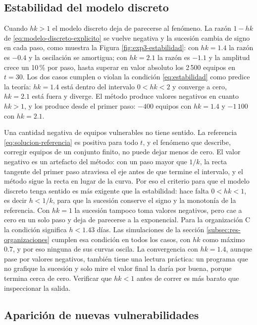 \subsection{Estabilidad del modelo discreto}
\label{subsec:dis-estabilidad}

Cuando $hk > 1$ el modelo discreto deja de parecerse al fenómeno. La razón $1 - hk$ de
\eqref{eq:modelo-discreto-explicito} se vuelve negativa y la sucesión cambia de signo en cada
paso, como muestra la Figura \ref{fig:exp3-estabilidad}: con $hk = 1.4$ la razón es
$-0.4$ y la oscilación se amortigua; con $hk = 2.1$ la razón es $-1.1$ y la amplitud crece un
10\,\% por paso, hasta superar en valor absoluto los 2\,500 equipos en $t = 30$. Los dos
casos cumplen o violan la condición \eqref{eq:estabilidad} como predice la teoría: $hk = 1.4$
está dentro del intervalo $0 < hk < 2$ y converge a cero, $hk = 2.1$ está fuera y diverge.
El método produce valores negativos en cuanto $hk > 1$, y los produce desde el primer paso:
$-400$ equipos con $hk = 1.4$ y $-1\,100$ con $hk = 2.1$.

Una cantidad negativa de equipos vulnerables no tiene sentido. La referencia
\eqref{eq:solucion-referencia} es positiva para todo $t$, y el fenómeno que describe, corregir
equipos de un conjunto finito, no puede dejar menos de cero. El valor negativo es un artefacto
del método: con un paso mayor que $1/k$, la recta tangente del primer paso atraviesa el eje
antes de que termine el intervalo, y el método sigue la recta en lugar de la curva. Por eso el
criterio para que el modelo discreto tenga sentido es más exigente que la estabilidad: hace
falta $0 < hk < 1$, es decir $h < 1/k$, para que la sucesión conserve el signo y la monotonía de
la referencia. Con $hk = 1$ la sucesión tampoco toma valores negativos, pero cae a cero en un
solo paso y deja de parecerse a la exponencial. Para la organización C la condición significa
$h < 1.43$ días. Las simulaciones de la
sección \ref{subsec:res-organizaciones} cumplen esa condición en todos los casos, con $hk$ como
máximo $0.7$, y por eso ninguna de sus curvas oscila. La convergencia con $hk = 1.4$, aunque
pase por valores negativos, también tiene una lectura práctica: un programa que no grafique la
sucesión y solo mire el valor final la daría por buena, porque termina cerca de cero. Verificar
que $hk < 1$ antes de correr es más barato que inspeccionar la salida.

\subsection{Aparición de nuevas vulnerabilidades}
\label{subsec:dis-lambda}

